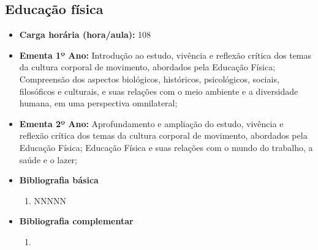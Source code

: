 \documentclass[11pt,fleqn]{book} %
\begin{document}
\newpage
\subsection{Educação física}\label{disc:educacaofisica}
\begin{itemize}
	\item \textbf{Carga horária (hora/aula):} 108
	\item \textbf{Ementa 1º Ano:} 
	Introdução ao estudo, vivência e reflexão crítica dos temas da cultura corporal de movimento, abordados pela Educação Física;
	Compreensão dos aspectos biológicos, históricos, psicológicos, sociais, filosóficos e culturais, e suas relações com o meio ambiente e a diversidade humana, em uma perspectiva omnilateral;
	
	\item \textbf{Ementa 2º Ano:} 
	Aprofundamento e ampliação do estudo, vivência e reflexão crítica dos temas da cultura corporal de movimento, abordados pela Educação Física;
	Educação Física e suas relações com o mundo do trabalho, a saúde e o lazer;	
	\item \textbf{Bibliografia básica}
	\begin{enumerate}
		\item NNNNN
	\end{enumerate}
	\item \textbf{Bibliografia complementar}
	\begin{enumerate}
		\item 
	\end{enumerate}	
\end{itemize}

\newpage
\end{document}
